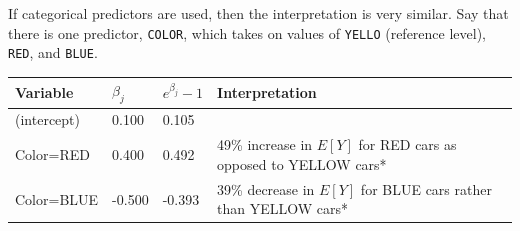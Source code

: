 \documentclass[
  openany]{book}
\begin{document}
If categorical predictors are used, then the interpretation is very similar. Say that there is one predictor, \texttt{COLOR}, which takes on values of \texttt{YELLO} (reference level), \texttt{RED}, and \texttt{BLUE}.

\begin{longtable}[]{@{}llll@{}}
\toprule
\begin{minipage}[b]{0.11\columnwidth}\raggedright
Variable\strut
\end{minipage} & \begin{minipage}[b]{0.11\columnwidth}\raggedright
\(\beta_j\)\strut
\end{minipage} & \begin{minipage}[b]{0.19\columnwidth}\raggedright
\(e^{\beta_j} - 1\)\strut
\end{minipage} & \begin{minipage}[b]{0.48\columnwidth}\raggedright
Interpretation\strut
\end{minipage}\tabularnewline
\midrule
\endhead
\begin{minipage}[t]{0.11\columnwidth}\raggedright
(intercept)\strut
\end{minipage} & \begin{minipage}[t]{0.11\columnwidth}\raggedright
0.100\strut
\end{minipage} & \begin{minipage}[t]{0.19\columnwidth}\raggedright
0.105\strut
\end{minipage} & \begin{minipage}[t]{0.48\columnwidth}\raggedright
\strut
\end{minipage}\tabularnewline
\begin{minipage}[t]{0.11\columnwidth}\raggedright
Color=RED\strut
\end{minipage} & \begin{minipage}[t]{0.11\columnwidth}\raggedright
0.400\strut
\end{minipage} & \begin{minipage}[t]{0.19\columnwidth}\raggedright
0.492\strut
\end{minipage} & \begin{minipage}[t]{0.48\columnwidth}\raggedright
49\% increase in \(E[Y]\) for RED cars as opposed to YELLOW cars*\strut
\end{minipage}\tabularnewline
\begin{minipage}[t]{0.11\columnwidth}\raggedright
Color=BLUE\strut
\end{minipage} & \begin{minipage}[t]{0.11\columnwidth}\raggedright
-0.500\strut
\end{minipage} & \begin{minipage}[t]{0.19\columnwidth}\raggedright
-0.393\strut
\end{minipage} & \begin{minipage}[t]{0.48\columnwidth}\raggedright
39\% decrease in \(E[Y]\) for BLUE cars rather than YELLOW cars*\strut
\end{minipage}\tabularnewline
\bottomrule
\end{longtable}
\end{document}
